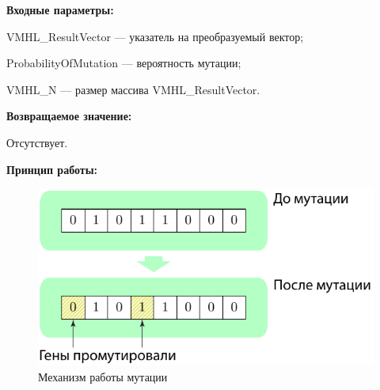 \textbf{Входные параметры:}

VMHL\_ResultVector --- указатель на преобразуемый вектор;
 
ProbabilityOfMutation --- вероятность мутации;
 
VMHL\_N --- размер массива VMHL\_ResultVector.

\textbf{Возвращаемое значение:} 

Отсутствует.

\textbf{Принцип работы:}

\begin{figure} [h]
  \center
  \includegraphics [scale=0.8] {TMHL_MutationBinaryVector_Sheme}
  \caption{Механизм работы мутации} 
  \label{img:TMHL_MutationBinaryVector_Sheme}  
\end{figure}
